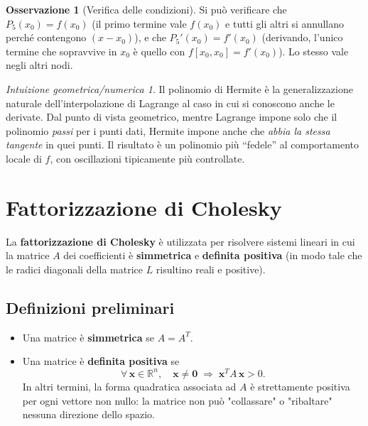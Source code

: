 \documentclass[a4paper,12pt]{article}
\theoremstyle{definition}
\newtheorem{osservazione}{Osservazione}[section]
\theoremstyle{remark}
\newtheorem*{intuizione}{Intuizione geometrica/numerica}
\begin{document}
\begin{osservazione}[Verifica delle condizioni]
Si può verificare che $P_5(x_0) = f(x_0)$ (il primo termine vale
$f(x_0)$ e tutti gli altri si annullano perché contengono $(x-x_0)$),
e che $P_5'(x_0) = f'(x_0)$ (derivando, l'unico termine che sopravvive
in $x_0$ è quello con $f[x_0,x_0] = f'(x_0)$). Lo stesso vale negli
altri nodi.
\end{osservazione}

\begin{intuizione}
Il polinomio di Hermite è la generalizzazione naturale dell'interpolazione
di Lagrange al caso in cui si conoscono anche le derivate. Dal punto di
vista geometrico, mentre Lagrange impone solo che il polinomio
\emph{passi} per i punti dati, Hermite impone anche che
\emph{abbia la stessa tangente} in quei punti. Il risultato è un
polinomio più ``fedele'' al comportamento locale di $f$, con oscillazioni
tipicamente più controllate.
\end{intuizione}

\section{Fattorizzazione di Cholesky}

La \textbf{fattorizzazione di Cholesky} è utilizzata per risolvere sistemi lineari in cui la matrice $A$ dei
coefficienti è \textbf{simmetrica} e \textbf{definita positiva} (in modo tale che le radici diagonali
della matrice $L$ risultino reali e positive).

\subsection{Definizioni preliminari}

\begin{itemize}
  \item Una matrice è \textbf{simmetrica} se $A = A^T$.
  \item Una matrice è \textbf{definita positiva} se
  \[
    \forall\,\mathbf{x} \in \mathbb{R}^n,\quad \mathbf{x} \neq \mathbf{0}
    \;\Longrightarrow\; \mathbf{x}^T A\,\mathbf{x} > 0.
  \]
  In altri termini, la forma quadratica associata ad $A$ è strettamente positiva per ogni vettore non
  nullo: la matrice non può "collassare" o "ribaltare" nessuna direzione dello spazio.
\end{itemize}
\end{document}
